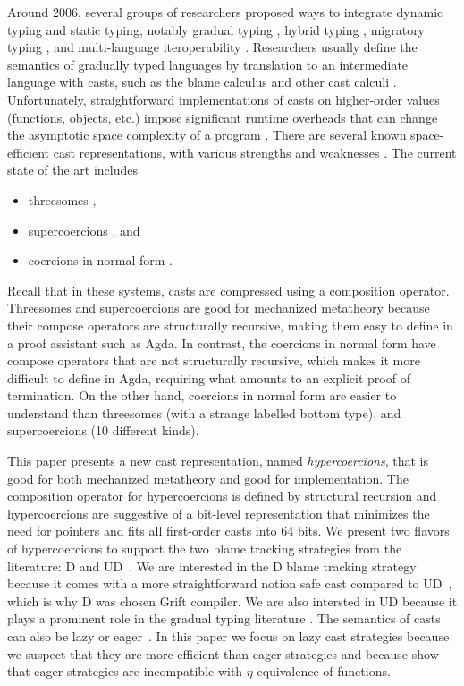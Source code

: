\documentclass[acmsmall,review,anonymous]{acmart}\settopmatter{printfolios=true,printccs=false,printacmref=false}
\begin{document}
Around 2006, several groups of researchers proposed ways to integrate
dynamic typing and static typing, notably gradual typing
\citep{siek2006gradual}, hybrid typing \citep{flanagan2006hybrid},
migratory typing \citep{Tobin-Hochstadt:2006fk}, and multi-language
iteroperability \citep{Gray:2005ij,Matthews:2007zr}. Researchers
usually define the semantics of gradually typed languages by
translation to an intermediate language with casts, such as the blame
calculus \citep{wadler2009well} and other cast calculi
\citep{siek2009exploring}. Unfortunately, straightforward
implementations of casts on higher-order values (functions, objects,
etc.) impose significant runtime overheads that can change the
asymptotic space complexity of a program
\citep{herman2010space}. There are several known space-efficient cast
representations, with various strengths and weaknesses
\citep{siek2015blame,siek2010threesomes,garcia2013calculating,kuhlenschmidt2018efficient,siek2012interpretations,garcia2014deriving}.
The current state of the art includes

\begin{itemize}
\item threesomes \citep{siek2010threesomes,garcia2013calculating},
\item supercoercions \citep{garcia2013calculating}, and
\item coercions in normal form
  \citep{siek2012interpretations,siek2015blame}.
\end{itemize}
Recall that in these systems, casts are compressed using a composition
operator.  Threesomes and supercoercions are good for mechanized
metatheory because their compose operators are structurally recursive,
making them easy to define in a proof assistant such as Agda. In
contrast, the coercions in normal form have compose operators that are
not structurally recursive, which makes it more difficult to define in
Agda, requiring what amounts to an explicit proof of termination.
%
On the other hand, coercions in normal form are easier to understand
than threesomes (with a strange labelled bottom type), and
supercoercions (10 different kinds).

This paper presents a new cast representation, named
\emph{hypercoercions}, that is good for both mechanized metatheory and
good for implementation. The composition operator for hypercoercions
is defined by structural recursion and hypercoercions are suggestive
of a bit-level representation that minimizes the need for pointers and
fits all first-order casts into 64 bits. We present two flavors of
hypercoercions to support the two blame tracking strategies from the
literature: D and UD~\citep{siek2009exploring}. We are interested in
the D blame tracking strategy because it comes with a more
straightforward notion safe cast compared to
UD~\citep{siek2009exploring}, which is why D was chosen Grift
compiler. We are also intersted in UD because it plays a prominent
role in the gradual typing literature \citep{wadler2009well}. The
semantics of casts can also be lazy or
eager~\citep{siek2009exploring}. In this paper we focus on lazy cast
strategies because we suspect that they are more efficient than eager
strategies and because \citet{new2019gradual} show that eager
strategies are incompatible with $\eta$-equivalence of functions.
\end{document}
